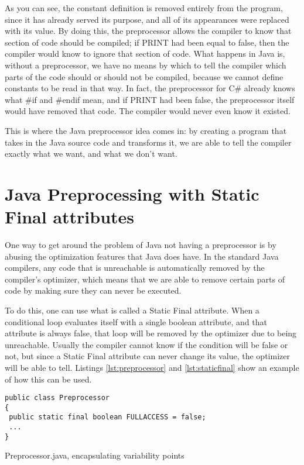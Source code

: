 As you can see, the constant definition is removed entirely from the program, since it has already served its purpose, and all of its appearances were replaced with its value. By doing this, the preprocessor allows the compiler to know that section of code should be compiled; if PRINT had been equal to false, then the compiler would know to ignore that section of code. What happens in Java is, without a preprocessor, we have no means by which to tell the compiler which parts of the code should or should not be compiled, because we cannot define constants to be read in that way. In fact, the preprocessor for C\# already knows what \#if and \#endif mean, and if PRINT had been false, the preprocessor itself would have removed that code. The compiler would never even know it existed.

This is where the Java preprocessor idea comes in: by creating a program that takes in the Java source code and transforms it, we are able to tell the compiler exactly what we want, and what we don't want.


\section{Java Preprocessing with Static Final attributes}

One way to get around the problem of Java not having a preprocessor is by abusing the optimization features that Java does have. In the standard Java compilers, any code that is unreachable is automatically removed by the compiler's optimizer, which means that we are able to remove certain parts of code by making sure they can never be executed.

To do this, one can use what is called a Static Final attribute. When a conditional loop evaluates itself with a single boolean attribute, and that attribute is always false, that loop will be removed by the optimizer due to being unreachable. Usually the compiler cannot know if the condition will be false or not, but since a Static Final attribute can never change its value, the optimizer will be able to tell. Listings \ref{lst:preprocessor} and \ref{lst:staticfinal} show an example of how this can be used.

\begin{listing}
\begin{verbatim}
public class Preprocessor
{
 public static final boolean FULLACCESS = false;
 ...
}
\end{verbatim}
\caption{Preprocessor.java, encapsulating variability points} \label{lst:preprocessor}
\end{listing}

